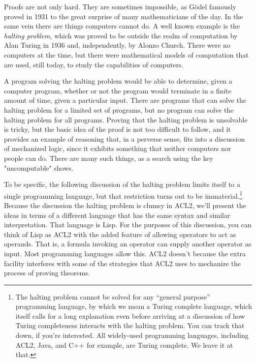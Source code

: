 Proofs are not only hard.
They are sometimes impossible, as G\"odel famously proved in 1931
to the great surprise of many mathematicians of the day.
In the same vein there are things computers cannot do.
A well known example is the  \emph{halting problem}, which
was proved to be outside the realm of computation
by Alan Turing in 1936
and, independently, by Alonzo Church.
There were no computers at the time,
but there were mathematical models of computation
that are used, still today, to study the capabilities of computers.

A program solving the
halting problem would be able to determine,
given a computer program, whether or not the program would terminate
in a finite amount of time, given a particular input.
There are programs that can solve the halting problem for
a limited set of programs,
but no program can solve the halting problem for all programs.
Proving that the halting problem is unsolvable is tricky,
but the basic idea of the proof is not too difficult to follow, and
it provides an example of reasoning that,
in a perverse sense, fits into a discussion of mechanized logic,
since it exhibits something that neither computers
nor people can do. There are many such things, as a search
using the key "uncomputable" shows.

To be specific, the following discussion of the halting problem
limits itself to a single programming language, but
that restriction turns out to be immaterial.\footnote{The
halting problem cannot be solved
for any ``general purpose'' programming language,
by which we mean a Turing complete language,
which itself calls for a long explanation even
before arriving at a discussion of how Turing completeness
interacts with the halting problem.
You can track that down, if you're interested.
All widely-used programming languages,
including ACL2, Java, and C++ for example, are Turing complete.
We leave it at that.}
Because the discussion the halting problem is clumsy in ACL2,
we'll present the ideas in terms of a different
language that has the same syntax
and similar interpretation. That language is Lisp.
For the purposes of this discussion,
you can think of Lisp as ACL2 with the added feature
of allowing operators to act as operands.
That is, a formula invoking an operator can supply
another operator as input.
Most programming languages allow this.
ACL2 doesn't because the extra facility
interferes with some of the strategies that ACL2 uses
to mechanize the process of proving theorems.

